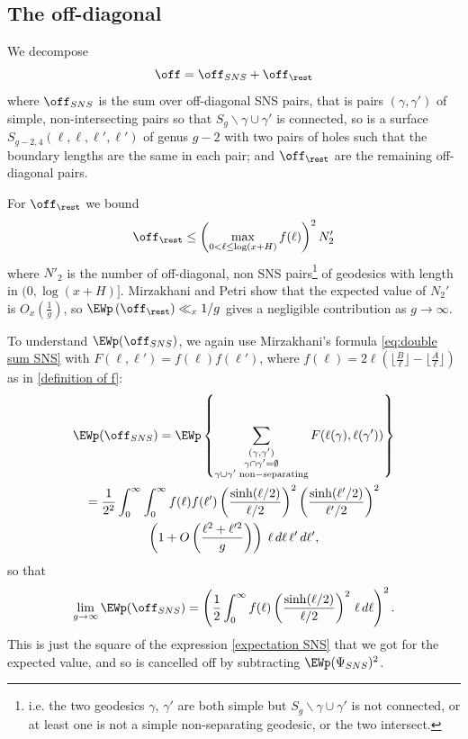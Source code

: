\documentclass[12pt]{amsart}
\begin{document}
 

\subsection{The off-diagonal}
We decompose
\[
\off =\off_{SNS}  + \off_{\rest}
\]
where $\off_{SNS} $ is 
 the sum over off-diagonal SNS pairs, that is pairs $(\gamma,\gamma')$ of simple, non-intersecting  pairs so that $S_g\backslash \gamma\cup \gamma'$ is connected, so is a surface $S_{g-2,4}(\ell,\ell,\ell',\ell')$  of genus $g-2$ with two pairs of holes such that the  boundary lengths are the same in each pair; and $\off_{\rest}$ are the remaining off-diagonal pairs.

For $\off_{\rest} $ we bound 
\[
\off_{\rest}\leq \left( \max_{0<\ell\leq \log(x+H)} f(\ell) \right)^2     N'_2
\]
 where $N'_2$ is the number of off-diagonal, non SNS pairs\footnote{i.e. the two geodesics $\gamma$, $\gamma'$  are both simple but $S_g \backslash  \gamma \cup \gamma'$ is not connected, or at least one is not a simple non-separating geodesic, or the two intersect.} of  geodesics with length in $(0, \log(x+H)]$. Mirzakhani and Petri \cite[proof of Proposition 4.2 and Proposition 4.5]{MP} %
show that the expected value of $N_2'$ is $O_x(\frac 1g)$, so $\EWp\left(\off_{\rest}\right)\ll_x 1/g $ gives a negligible contribution as $g\to \infty$. 

To understand  $\EWp(\off_{SNS})$, we again use Mirzakhani's formula \eqref{eq:double sum SNS} with    $F(\ell,\ell') = f(\ell)f(\ell')$,   where $f(\ell)=2\ell (\lfloor \frac B \ell \rfloor-\lfloor \frac A \ell \rfloor)$ as in \eqref{definition of f}: 
\begin{multline*}%
\EWp(  \off_{SNS}) = \EWp\left\{ \sum_{\substack {(\gamma,\gamma')\\ \gamma\cap \gamma'=\emptyset\\  \gamma\cup \gamma'\;{\rm non-separating}}} F(\ell(\gamma), \ell(\gamma'))   \right\} 
\\
=\frac 1{2^2} \int_0^\infty\int_0^\infty f(\ell)f(\ell')  \left( \frac{\sinh(\ell/2)}{\ell/2} \right)^2 \left( \frac{\sinh(\ell'/2)}{\ell'/2} \right)^2
\\
\left( 1+O\left( \frac{\ell^2+\ell'^2}{g} \right) \right) \; \ell \,d\ell \,\ell'\,d\ell',
\end{multline*}
so that 
\[
\lim_{g\to \infty} \EWp(  \off_{SNS})  =    \left( \frac 12\int_{0}^{\infty}    f(\ell) \left( \frac{\sinh(\ell/2)}{\ell/2} \right)^2 \,\ell \,d\ell \right)^2.	
\]
This  is just the square of the expression \eqref{expectation SNS} that we got for the expected value, and so is cancelled off by subtracting $\EWp(\Psi_{SNS})^2$. 
\end{document}
